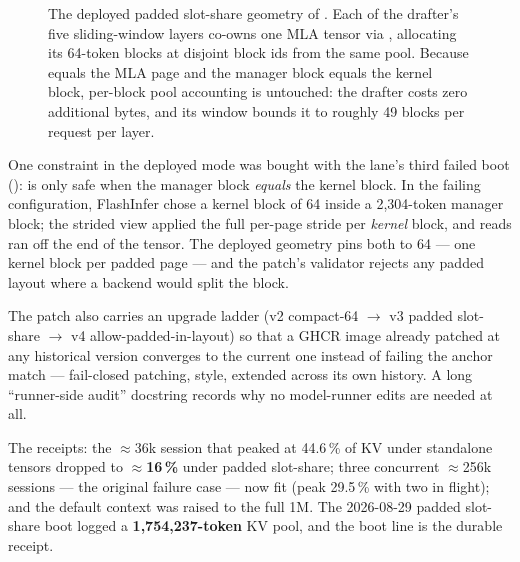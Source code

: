 \begin{figure}[htbp]
{}
\caption{The deployed padded slot-share geometry of
. Each of the drafter's five
sliding-window layers co-owns one MLA tensor via ,
allocating its 64-token blocks at disjoint block ids from the same pool.
Because  equals the MLA page and the manager block
equals the kernel block, per-block pool accounting is untouched: the drafter
costs zero additional bytes, and its window bounds it to roughly 49 blocks
per request per layer.}
\label{fig:dflash2-slotshare}
\end{figure}

One constraint in the deployed mode was bought with the lane's third failed
boot ():  is only safe when
the manager block \emph{equals} the kernel block. In the failing
configuration, FlashInfer chose a kernel block of 64 inside a 2{,}304-token
manager block; the strided view applied the full per-page stride per
\emph{kernel} block, and reads ran off the end of the tensor. The deployed
geometry pins both to 64 --- one kernel block per padded page --- and the
patch's validator rejects any padded layout where a backend would split the
block.

The patch also carries an upgrade ladder (v2 compact-64
$\rightarrow$ v3 padded slot-share $\rightarrow$ v4
allow-padded-in-layout) so that a GHCR image already patched at any
historical version converges to the current one instead of failing the
anchor match --- fail-closed patching,  style, extended
across its own history. A long ``runner-side audit'' docstring records why
no model-runner edits are needed at all.

The receipts: the $\approx$36k session that peaked at 44.6\,\% of KV under
standalone tensors dropped to $\approx$\textbf{16\,\%} under padded
slot-share; three concurrent $\approx$256k sessions --- the original failure
case --- now fit (peak 29.5\,\% with two in flight); and the default context
was raised to the full 1M. The 2026-08-29 padded slot-share boot logged a
\textbf{1{,}754{,}237-token} KV pool, and the boot line
 is the durable receipt.

